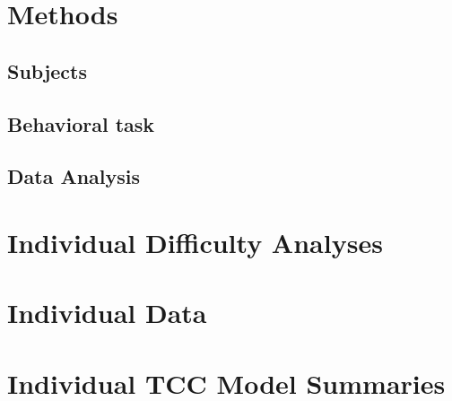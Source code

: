 \documentclass[9pt,biorxiv,lineno,onehalfspacing]{lapreprint}
\begin{document}
\begin{refsection}
\newpage
\section{Methods}
\subsection{Subjects}

\subsection{Behavioral task}

\subsection{Data Analysis}






\section{Individual Difficulty Analyses}
\label{app:Indi_difficulty}


\section{Individual Data}
\label{app:IndDiffs}


%     

\section{Individual TCC Model Summaries}
\label{app:TCCModelSummaries} 



\end{refsection}
\end{document}
